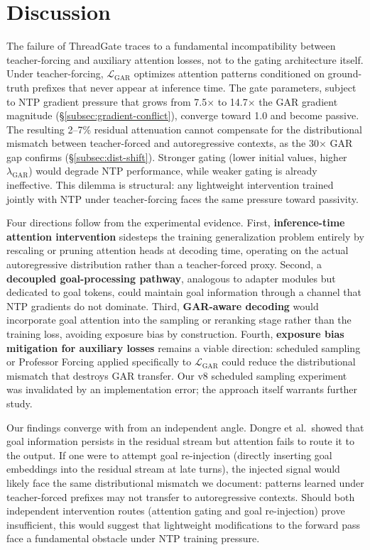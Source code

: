 \section{Discussion}\label{sec:discussion}

The failure of ThreadGate traces to a fundamental incompatibility between teacher-forcing and auxiliary attention losses, not to the gating architecture itself. Under teacher-forcing, $\mathcal{L}_\text{GAR}$ optimizes attention patterns conditioned on ground-truth prefixes that never appear at inference time. The gate parameters, subject to NTP gradient pressure that grows from 7.5$\times$ to 14.7$\times$ the GAR gradient magnitude (\S\ref{subsec:gradient-conflict}), converge toward 1.0 and become passive. The resulting 2--7\% residual attenuation cannot compensate for the distributional mismatch between teacher-forced and autoregressive contexts, as the 30$\times$ GAR gap confirms (\S\ref{subsec:dist-shift}). Stronger gating (lower initial values, higher $\lambda_\text{GAR}$) would degrade NTP performance, while weaker gating is already ineffective. This dilemma is structural: any lightweight intervention trained jointly with NTP under teacher-forcing faces the same pressure toward passivity.

Four directions follow from the experimental evidence. First, \textbf{inference-time attention intervention} sidesteps the training generalization problem entirely by rescaling or pruning attention heads at decoding time, operating on the actual autoregressive distribution rather than a teacher-forced proxy. Second, a \textbf{decoupled goal-processing pathway}, analogous to adapter modules but dedicated to goal tokens, could maintain goal information through a channel that NTP gradients do not dominate. Third, \textbf{GAR-aware decoding} would incorporate goal attention into the sampling or reranking stage rather than the training loss, avoiding exposure bias by construction. Fourth, \textbf{exposure bias mitigation for auxiliary losses} remains a viable direction: scheduled sampling \citep{bengio2015scheduled} or Professor Forcing \citep{lamb2016professor} applied specifically to $\mathcal{L}_\text{GAR}$ could reduce the distributional mismatch that destroys GAR transfer. Our v8 scheduled sampling experiment was invalidated by an implementation error; the approach itself warrants further study.

Our findings converge with \citet{dongre2026attention} from an independent angle. Dongre et al.\ showed that goal information persists in the residual stream but attention fails to route it to the output. If one were to attempt goal re-injection (directly inserting goal embeddings into the residual stream at late turns), the injected signal would likely face the same distributional mismatch we document: patterns learned under teacher-forced prefixes may not transfer to autoregressive contexts. Should both independent intervention routes (attention gating and goal re-injection) prove insufficient, this would suggest that lightweight modifications to the forward pass face a fundamental obstacle under NTP training pressure.

